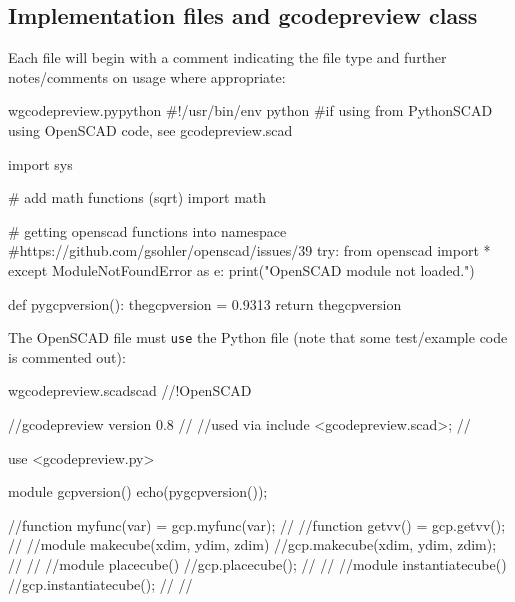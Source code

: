 \documentclass{ltxdoc}
\begin{document}

\subsection{Implementation files and gcodepreview class}
 
Each file will begin with a comment indicating the file type and further notes/comments on usage where appropriate:


\begin{writecode}{w}{gcodepreview.py}{python}
#!/usr/bin/env python
#if using from PythonSCAD using OpenSCAD code, see gcodepreview.scad

import sys

# add math functions (sqrt)
import math

# getting openscad functions into namespace
#https://github.com/gsohler/openscad/issues/39
try:
    from openscad import *
except ModuleNotFoundError as e:
    print("OpenSCAD module not loaded.")
    
def pygcpversion():
    thegcpversion = 0.9313
    return thegcpversion
 
\end{writecode}
\addtocounter{gcpy}{20}

The OpenSCAD file must \verb|use| the Python file (note that some test/example code is commented out):

\begin{writecode}{w}{gcodepreview.scad}{scad}
//!OpenSCAD
 
//gcodepreview version 0.8
//
//used via include <gcodepreview.scad>;
//

use <gcodepreview.py>

module gcpversion(){
echo(pygcpversion());
}

//function myfunc(var) = gcp.myfunc(var);
//
//function getvv() = gcp.getvv();
//
//module makecube(xdim, ydim, zdim){
//gcp.makecube(xdim, ydim, zdim);
//}
//
//module placecube(){
//gcp.placecube();
//}
//
//module instantiatecube(){
//gcp.instantiatecube();
//}
//
\end{writecode}
\addtocounter{gcpscad}{30}
\end{document}
